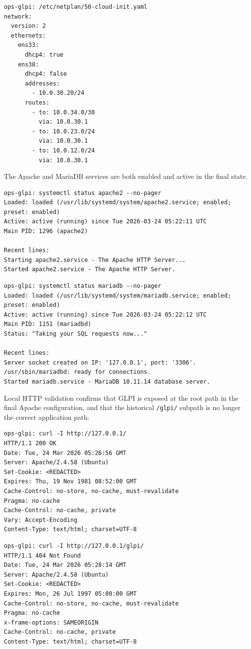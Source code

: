 \documentclass[11pt]{article}
\begin{document}
\begin{verbatim}
ops-glpi: /etc/netplan/50-cloud-init.yaml
network:
  version: 2
  ethernets:
    ens33:
      dhcp4: true
    ens38:
      dhcp4: false
      addresses:
        - 10.0.30.20/24
      routes:
        - to: 10.0.34.0/30
          via: 10.0.30.1
        - to: 10.0.23.0/24
          via: 10.0.30.1
        - to: 10.0.12.0/24
          via: 10.0.30.1
\end{verbatim}

The Apache and MariaDB services are both enabled and active in the final state.

\begin{verbatim}
ops-glpi: systemctl status apache2 --no-pager
Loaded: loaded (/usr/lib/systemd/system/apache2.service; enabled; preset: enabled)
Active: active (running) since Tue 2026-03-24 05:22:11 UTC
Main PID: 1296 (apache2)

Recent lines:
Starting apache2.service - The Apache HTTP Server...
Started apache2.service - The Apache HTTP Server.
\end{verbatim}

\begin{verbatim}
ops-glpi: systemctl status mariadb --no-pager
Loaded: loaded (/usr/lib/systemd/system/mariadb.service; enabled; preset: enabled)
Active: active (running) since Tue 2026-03-24 05:22:12 UTC
Main PID: 1151 (mariadbd)
Status: "Taking your SQL requests now..."

Recent lines:
Server socket created on IP: '127.0.0.1', port: '3306'.
/usr/sbin/mariadbd: ready for connections.
Started mariadb.service - MariaDB 10.11.14 database server.
\end{verbatim}

Local HTTP validation confirms that GLPI is exposed at the root path in the final Apache configuration, and that the historical \texttt{/glpi/} subpath is no longer the correct application path.

\begin{verbatim}
ops-glpi: curl -I http://127.0.0.1/
HTTP/1.1 200 OK
Date: Tue, 24 Mar 2026 05:26:56 GMT
Server: Apache/2.4.58 (Ubuntu)
Set-Cookie: <REDACTED>
Expires: Thu, 19 Nov 1981 08:52:00 GMT
Cache-Control: no-store, no-cache, must-revalidate
Pragma: no-cache
Cache-Control: no-cache, private
Vary: Accept-Encoding
Content-Type: text/html; charset=UTF-8
\end{verbatim}

\begin{verbatim}
ops-glpi: curl -I http://127.0.0.1/glpi/
HTTP/1.1 404 Not Found
Date: Tue, 24 Mar 2026 05:28:14 GMT
Server: Apache/2.4.58 (Ubuntu)
Set-Cookie: <REDACTED>
Expires: Mon, 26 Jul 1997 05:00:00 GMT
Cache-Control: no-store, no-cache, must-revalidate
Pragma: no-cache
x-frame-options: SAMEORIGIN
Cache-Control: no-cache, private
Content-Type: text/html; charset=UTF-8
\end{verbatim}
\end{document}
